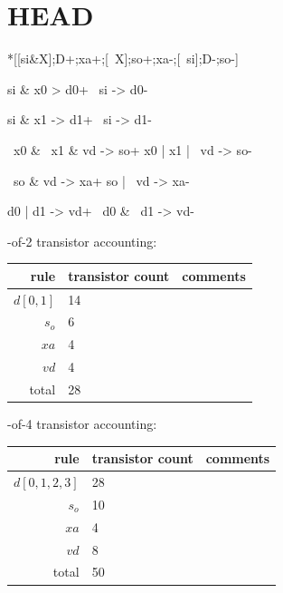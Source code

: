 \documentclass{article}
\begin{document}
\section{HEAD \label{sec:DESERIAL_CHAIN_HEAD}}

\begin{hse}
*[[si&X];D+;xa+;[~X];so+;xa-;[~si];D-;so-]
\end{hse}

\begin{prs2}
si & x0 > d0+
~si -> d0-

si & x1 -> d1+
~si -> d1-
\end{prs2}

\begin{prs2}
~x0 & ~x1 & vd -> so+
x0 | x1 | ~vd -> so-
\end{prs2}

\begin{prs2}
~so & vd -> xa+
so | ~vd -> xa-
\end{prs2}

\begin{prs2}
d0 | d1 -> vd+
~d0 & ~d1 -> vd-
\end{prs2}

-of-2 transistor accounting:

\begin{center}
    \begin{tabular}{|r|l|l|}
    \hline
    rule & transistor count & comments \\ \hline
    $d[0,1]$ & 14 & \\ \hline
    $s_o$ & 6 & \\ \hline
    $xa$ & 4 & \\ \hline
    $vd$ & 4 & \\ \hline
    \hline total & 28 & \\ \hline
    \end{tabular}
\end{center}

-of-4 transistor accounting:

\begin{center}
    \begin{tabular}{|r|l|l|}
    \hline
    rule & transistor count & comments \\ \hline
    $d[0,1,2,3]$ & 28 & \\ \hline
    $s_o$ & 10 & \\ \hline
    $xa$ & 4 & \\ \hline
    $vd$ & 8 & \\ \hline
    \hline total & 50 & \\ \hline
    \end{tabular}
\end{center}
\end{document}
